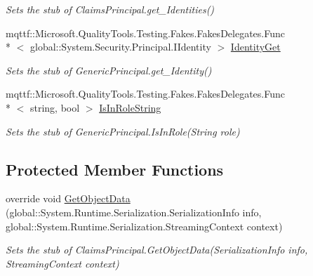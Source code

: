 \begin{DoxyCompactItemize}
\begin{DoxyCompactList}\small\item\em Sets the stub of Claims\-Principal.\-get\-\_\-\-Identities()\end{DoxyCompactList}\item 
mqttf\-::\-Microsoft.\-Quality\-Tools.\-Testing.\-Fakes.\-Fakes\-Delegates.\-Func\\*
$<$ global\-::\-System.\-Security.\-Principal.\-I\-Identity $>$ \hyperlink{class_system_1_1_security_1_1_principal_1_1_fakes_1_1_stub_generic_principal_a54c442e43327e371c20db16db50ca5f6}{Identity\-Get}
\begin{DoxyCompactList}\small\item\em Sets the stub of Generic\-Principal.\-get\-\_\-\-Identity()\end{DoxyCompactList}\item 
mqttf\-::\-Microsoft.\-Quality\-Tools.\-Testing.\-Fakes.\-Fakes\-Delegates.\-Func\\*
$<$ string, bool $>$ \hyperlink{class_system_1_1_security_1_1_principal_1_1_fakes_1_1_stub_generic_principal_a56cf239a2c1784fb9563e0004c002cdf}{Is\-In\-Role\-String}
\begin{DoxyCompactList}\small\item\em Sets the stub of Generic\-Principal.\-Is\-In\-Role(\-String role)\end{DoxyCompactList}\end{DoxyCompactItemize}
\subsection*{Protected Member Functions}
\begin{DoxyCompactItemize}
\item 
override void \hyperlink{class_system_1_1_security_1_1_principal_1_1_fakes_1_1_stub_generic_principal_ae3216e8b2dae4bb24fd6bb03974c7ec1}{Get\-Object\-Data} (global\-::\-System.\-Runtime.\-Serialization.\-Serialization\-Info info, global\-::\-System.\-Runtime.\-Serialization.\-Streaming\-Context context)
\begin{DoxyCompactList}\small\item\em Sets the stub of Claims\-Principal.\-Get\-Object\-Data(\-Serialization\-Info info, Streaming\-Context context)\end{DoxyCompactList}\end{DoxyCompactItemize}
